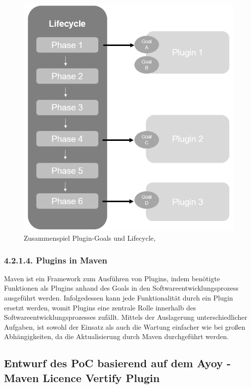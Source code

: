 \begin{figure}[h]
    \centering
    \includegraphics[scale=0.4]{Bilder/lifecycle_maven.png}
    \caption{Zusammenspiel Plugin-Goals und Lifecycle, \cite[S. 59]{varanasi_introducing_2019}}
\end{figure}

\subsubsection{4.2.1.4. Plugins in Maven}

Maven ist ein Framework zum Ausführen von Plugins, indem benötigte Funktionen als Plugins anhand des Goals in den Softwareentwicklungsprozess ausgeführt werden. Infolgedessen kann jede Funktionalität durch ein Plugin ersetzt werden, womit Plugins eine zentrale Rolle innerhalb des Softwareentwicklungsprozesses zufällt. Mittels der Auslagerung unterschiedlicher Aufgaben, ist sowohl der Einsatz als auch die Wartung einfacher wie bei großen Abhängigkeiten, da die Aktualisierung durch Maven durchgeführt werden.  

\subsection{Entwurf des PoC basierend auf dem Ayoy - Maven Licence Vertify Plugin}

